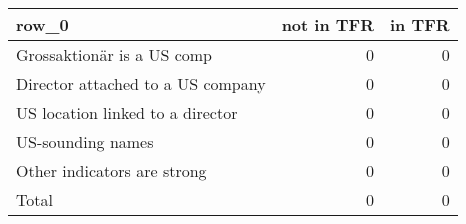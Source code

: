 \begin{tabular}{lrr}
\toprule
row_0 & not in TFR & in TFR \\
\midrule
Grossaktionär is a US comp & 0 & 0 \\
Director attached to a US company & 0 & 0 \\
US location linked to a director & 0 & 0 \\
US-sounding names & 0 & 0 \\
Other indicators are strong & 0 & 0 \\
Total & 0 & 0 \\
\bottomrule
\end{tabular}
